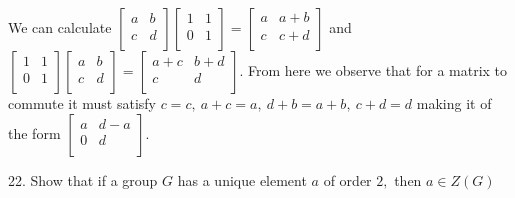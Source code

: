 \begin{mdframed}[style=darkAnswer,frametitle={Joe Starr}]
We can calculate $\begin{bmatrix}
  a & b\\
  c & d\\
\end{bmatrix}\begin{bmatrix}
  1 & 1\\
  0 & 1\\
\end{bmatrix}=\begin{bmatrix}
  a & a+b\\
  c & c+d\\
\end{bmatrix}$
and $\begin{bmatrix}
  1 & 1\\
  0 & 1\\
\end{bmatrix}\begin{bmatrix}
  a & b\\
  c & d\\
\end{bmatrix}=\begin{bmatrix}
  a+c & b+d\\
  c & d\\
\end{bmatrix}$. From here we observe that for a matrix to commute it must 
satisfy $c=c,\ a+c=a,\ d+b=a+b,\ c+d=d$ making it of the form $\begin{bmatrix}
  a & d-a\\
  0 & d\\
\end{bmatrix}$.
\end{mdframed}
\newpage
\begin{mdframed}[style=darkQuesion]
22. Show that if a group $G$ has a unique element $a$ of order $2,$ then $a \in Z(G)$

\end{mdframed}

